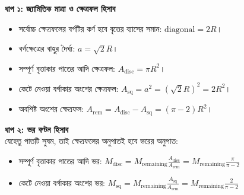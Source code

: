\documentclass[12pt, a4paper]{article}
\begin{document}
\begin{tcolorbox}[solutionbox={সমাধান (Solution)}]
\noindent
\textbf{ধাপ ১: জ্যামিতিক মাত্রা ও ক্ষেত্রফল হিসাব} \\
\begin{itemize}[leftmargin=*, parsep=0.4ex]
    \item সর্বোচ্চ ক্ষেত্রফলের বর্গটির কর্ণ হবে বৃত্তের ব্যাসের সমান: $\text{diagonal} = 2 R$।
    \item বর্গক্ষেত্রের বাহুর দৈর্ঘ্য: $a = \sqrt{2} R$।
    \item সম্পূর্ণ বৃত্তাকার পাতের আদি ক্ষেত্রফল: $A_{\text{disc}} = \pi R^2$।
    \item কেটে নেওয়া বর্গাকার অংশের ক্ষেত্রফল: $A_{\text{sq}} = a^2 = (\sqrt{2} R)^2 = 2 R^2$।
    \item অবশিষ্ট অংশের ক্ষেত্রফল: $A_{\text{rem}} = A_{\text{disc}} - A_{\text{sq}} = (\pi - 2) R^2$।
\end{itemize}

\vspace{0.5em}
\noindent
\textbf{ধাপ ২: ভর বণ্টন হিসাব} \\
যেহেতু পাতটি সুষম, তাই ক্ষেত্রফলের অনুপাতই হবে ভরের অনুপাত:
\begin{itemize}[leftmargin=*, parsep=0.4ex]
    \item সম্পূর্ণ বৃত্তাকার পাতের আদি ভর: $M_{\text{disc}} = M_{\text{remaining}} \frac{A_{\text{disc}}}{A_{\text{rem}}} = M_{\text{remaining}} \frac{\pi}{\pi - 2}$
    \item কেটে নেওয়া বর্গাকার অংশের ভর: $M_{\text{sq}} = M_{\text{remaining}} \frac{A_{\text{sq}}}{A_{\text{rem}}} = M_{\text{remaining}} \frac{2}{\pi - 2}$
\end{itemize}

\vspace{1em}
\begin{center}
\end{center}
\end{tcolorbox}
\end{document}
